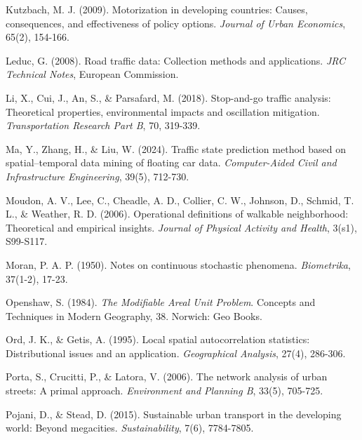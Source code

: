 \documentclass[12pt,a4paper]{article}
\begin{document}
Kutzbach, M. J. (2009). Motorization in developing countries: Causes, consequences, and effectiveness of policy options. \emph{Journal of Urban Economics}, 65(2), 154-166.



Leduc, G. (2008). Road traffic data: Collection methods and applications. \emph{JRC Technical Notes}, European Commission.


Li, X., Cui, J., An, S., \& Parsafard, M. (2018). Stop-and-go traffic analysis: Theoretical properties, environmental impacts and oscillation mitigation. \emph{Transportation Research Part B}, 70, 319-339.

Ma, Y., Zhang, H., \& Liu, W. (2024). Traffic state prediction method based on spatial--temporal data mining of floating car data. \emph{Computer-Aided Civil and Infrastructure Engineering}, 39(5), 712-730.

Moudon, A. V., Lee, C., Cheadle, A. D., Collier, C. W., Johnson, D., Schmid, T. L., \& Weather, R. D. (2006). Operational definitions of walkable neighborhood: Theoretical and empirical insights. \emph{Journal of Physical Activity and Health}, 3(s1), S99-S117.

Moran, P. A. P. (1950). Notes on continuous stochastic phenomena. \emph{Biometrika}, 37(1-2), 17-23.

Openshaw, S. (1984). \emph{The Modifiable Areal Unit Problem}. Concepts and Techniques in Modern Geography, 38. Norwich: Geo Books.

Ord, J. K., \& Getis, A. (1995). Local spatial autocorrelation statistics: Distributional issues and an application. \emph{Geographical Analysis}, 27(4), 286-306.

Porta, S., Crucitti, P., \& Latora, V. (2006). The network analysis of urban streets: A primal approach. \emph{Environment and Planning B}, 33(5), 705-725.

Pojani, D., \& Stead, D. (2015). Sustainable urban transport in the developing world: Beyond megacities. \emph{Sustainability}, 7(6), 7784-7805.
\end{document}
